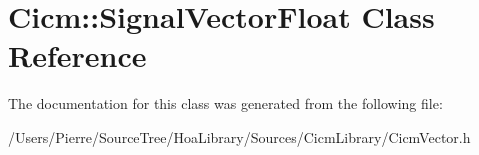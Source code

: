 \hypertarget{class_cicm_1_1_signal_vector_float}{\section{Cicm\-:\-:Signal\-Vector\-Float Class Reference}
\label{class_cicm_1_1_signal_vector_float}
}


The documentation for this class was generated from the following file\-:\begin{DoxyCompactItemize}
\item 
/\-Users/\-Pierre/\-Source\-Tree/\-Hoa\-Library/\-Sources/\-Cicm\-Library/Cicm\-Vector.\-h\end{DoxyCompactItemize}
